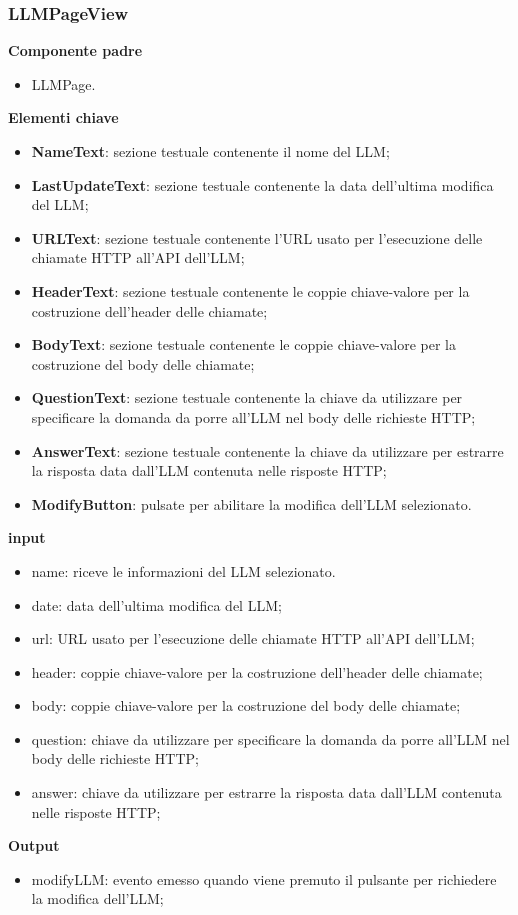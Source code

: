 \subsubsection{LLMPageView}
\textbf{Componente padre}
\begin{itemize}
    \item LLMPage.
\end{itemize}
\textbf{Elementi chiave}
\begin{itemize}
    \item \textbf{NameText}: sezione testuale contenente il nome del LLM; 
    \item \textbf{LastUpdateText}: sezione testuale contenente la data dell'ultima modifica del LLM;
    \item \textbf{URLText}: sezione testuale contenente l'URL usato per l'esecuzione delle chiamate HTTP all'API dell'LLM;
    \item \textbf{HeaderText}: sezione testuale contenente le coppie chiave-valore per la costruzione dell'header delle chiamate;
    \item \textbf{BodyText}: sezione testuale contenente le coppie chiave-valore per la costruzione del body delle chiamate;
    \item \textbf{QuestionText}: sezione testuale contenente la chiave da utilizzare per specificare la domanda da porre all'LLM nel body delle richieste HTTP;
    \item \textbf{AnswerText}: sezione testuale contenente la chiave da utilizzare per estrarre la risposta data dall'LLM contenuta nelle risposte HTTP;
    \item \textbf{ModifyButton}: pulsate per abilitare la modifica dell'LLM selezionato.
\end{itemize}
\textbf{input}
\begin{itemize}
    \item name: riceve le informazioni del LLM selezionato.
    \item date: data dell'ultima modifica del LLM;
    \item url: URL usato per l'esecuzione delle chiamate HTTP all'API dell'LLM;
    \item header: coppie chiave-valore per la costruzione dell'header delle chiamate;
    \item body: coppie chiave-valore per la costruzione del body delle chiamate;
    \item question: chiave da utilizzare per specificare la domanda da porre all'LLM nel body delle richieste HTTP;
    \item answer: chiave da utilizzare per estrarre la risposta data dall'LLM contenuta nelle risposte HTTP;
\end{itemize}
\textbf{Output}
\begin{itemize}
    \item modifyLLM: evento emesso quando viene premuto il pulsante per richiedere la modifica dell'LLM;
\end{itemize}
